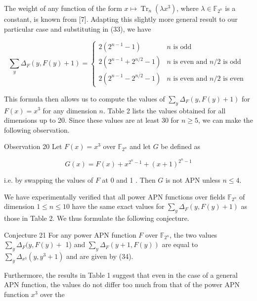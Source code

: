 \documentclass[10pt]{article}
\begin{document}
The weight of any function of the form $x \mapsto \operatorname{Tr}_{n}\left(\lambda x^{3}\right)$, where $\lambda \in \mathbb{F}_{2^{n}}$ is a constant, is known from [7]. Adapting this slightly more general result to our particular case and substituting in (33), we have

\[
\sum_{y} \Delta_{F}(y, F(y)+1)= \begin{cases}2\left(2^{n-1}-1\right) & n \text { is odd }  \tag{34}\\ 2\left(2^{n-1}+2^{n / 2}-1\right) & n \text { is even and } n / 2 \text { is odd } \\ 2\left(2^{n-1}-2^{n / 2}-1\right) & n \text { is even and } n / 2 \text { is even }\end{cases}
\]

This formula then allows us to compute the values of $\sum_{y} \Delta_{F}(y, F(y)+1)$ for $F(x)=x^{3}$ for any dimension $n$. Table 2 lists the values obtained for all dimensions up to 20. Since these values are at least 30 for $n \geq 5$, we can make the following observation.

Observation 20 Let $F(x)=x^{3}$ over $\mathbb{F}_{2^{n}}$ and let $G$ be defined as

$$
G(x)=F(x)+x^{2^{n}-1}+(x+1)^{2^{n}-1}
$$

i.e. by swapping the values of $F$ at 0 and 1 . Then $G$ is not APN unless $n \leq 4$.

We have experimentally verified that all power APN functions over fields $\mathbb{F}_{2^{n}}$ of dimension $1 \leq n \leq 10$ have the same exact values for $\sum_{y} \Delta_{F}(y, F(y)+1)$ as those in Table 2. We thus formulate the following conjecture.

Conjecture 21 For any power APN function $F$ over $\mathbb{F}_{2^{n}}$, the two values $\sum_{y} \Delta_{F}(y, F(y)+$ 1) and $\sum_{y} \Delta_{F}(y+1, F(y))$ are equal to $\sum_{y} \Delta_{x^{3}}\left(y, y^{3}+1\right)$ and are given by (34).

Furthermore, the results in Table 1 suggest that even in the case of a general APN function, the values do not differ too much from that of the power APN function $x^{3}$ over the
\end{document}

